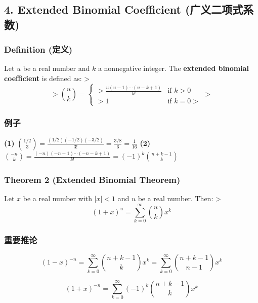 \documentclass[10pt,a4paper,openany]{ctexbook}
\theoremstyle{definition}
\theoremstyle{remark}
\renewenvironment{quote}
  {\list{}{\leftmargin=1em\rightmargin=0pt\topsep=0.5pt\partopsep=0pt}\item[]}
  {\endlist}
\begin{document}
\subsection{4. Extended Binomial Coefficient (广义二项式系数)}

\subsubsection{Definition (定义)}

\begin{quote}
Let $u$ be a real number and $k$ a nonnegative integer. The \textbf{extended binomial coefficient} is defined as:
>
\[
> \binom{u}{k} = \begin{cases}
> \frac{u(u-1)\cdots(u-k+1)}{k!} & \text{if } k > 0 \\
> 1 & \text{if } k = 0
> \end{cases}
> 
\]


\end{quote}

\subsubsection{例子}

\textbf{(1)} $\binom{1/2}{3} = \frac{(1/2)(-1/2)(-3/2)}{3!} = \frac{3/8}{6} = \frac{1}{16}$
\textbf{(2)} $\binom{-n}{k} = \frac{(-n)(-n-1)\cdots(-n-k+1)}{k!} = (-1)^k \binom{n+k-1}{k}$
\vspace{-2pt}

\subsubsection{Theorem 2 (Extended Binomial Theorem)}

\begin{quote}
Let $x$ be a real number with $|x| < 1$ and $u$ be a real number. Then:
>
\[
(1+x)^u = \sum_{k=0}^\infty \binom{u}{k} x^k
\]


\end{quote}

\subsubsection{重要推论}

\[
(1-x)^{-n} = \sum_{k=0}^\infty \binom{n+k-1}{k} x^k = \sum_{k=0}^\infty \binom{n+k-1}{n-1} x^k
\]

\[
(1+x)^{-n} = \sum_{k=0}^\infty (-1)^k \binom{n+k-1}{k} x^k
\]
\end{document}
